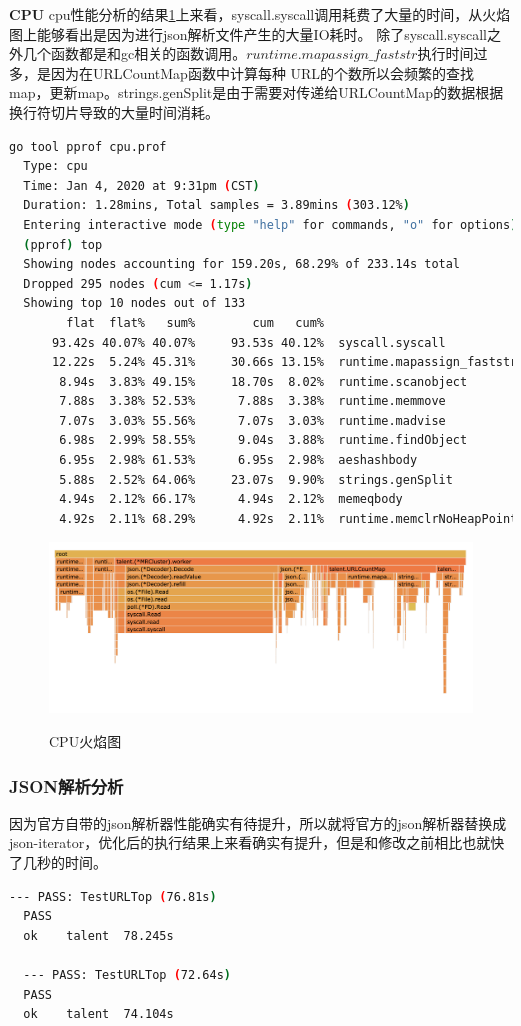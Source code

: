 \documentclass[UTF8]{ctexart}
\begin{document}
\textbf{CPU}
cpu性能分析的结果\ref{cpu}上来看，syscall.syscall调用耗费了大量的时间，从火焰图上能够看出是因为进行json解析文件产生的大量IO耗时。
除了syscall.syscall之外几个函数都是和gc相关的函数调用。$runtime.mapassign\_faststr$执行时间过多，是因为在URLCountMap函数中计算每种
URL的个数所以会频繁的查找map，更新map。strings.genSplit是由于需要对传递给URLCountMap的数据根据换行符切片导致的大量时间消耗。

\begin{lstlisting}[language=bash]
  go tool pprof cpu.prof                                                                            
  Type: cpu
  Time: Jan 4, 2020 at 9:31pm (CST)
  Duration: 1.28mins, Total samples = 3.89mins (303.12%)
  Entering interactive mode (type "help" for commands, "o" for options)
  (pprof) top
  Showing nodes accounting for 159.20s, 68.29% of 233.14s total
  Dropped 295 nodes (cum <= 1.17s)
  Showing top 10 nodes out of 133
        flat  flat%   sum%        cum   cum%
      93.42s 40.07% 40.07%     93.53s 40.12%  syscall.syscall
      12.22s  5.24% 45.31%     30.66s 13.15%  runtime.mapassign_faststr
       8.94s  3.83% 49.15%     18.70s  8.02%  runtime.scanobject
       7.88s  3.38% 52.53%      7.88s  3.38%  runtime.memmove
       7.07s  3.03% 55.56%      7.07s  3.03%  runtime.madvise
       6.98s  2.99% 58.55%      9.04s  3.88%  runtime.findObject
       6.95s  2.98% 61.53%      6.95s  2.98%  aeshashbody
       5.88s  2.52% 64.06%     23.07s  9.90%  strings.genSplit
       4.94s  2.12% 66.17%      4.94s  2.12%  memeqbody
       4.92s  2.11% 68.29%      4.92s  2.11%  runtime.memclrNoHeapPointers
\end{lstlisting}

\begin{figure}[H]
  \caption{CPU火焰图}
  \label{cpu}
  \centering
  \includegraphics[width=1\textwidth]{fig/cpu.png}\\
\end{figure}

\subsubsection{JSON解析分析}
因为官方自带的json解析器性能确实有待提升，所以就将官方的json解析器替换成
json-iterator，优化后的执行结果上来看确实有提升，但是和修改之前相比也就快了几秒的时间。
\label{op-json}
\begin{lstlisting}[language=bash]
  --- PASS: TestURLTop (76.81s)
  PASS
  ok  	talent	78.245s
  
  --- PASS: TestURLTop (72.64s)
  PASS
  ok  	talent	74.104s
\end{lstlisting}
\end{document}
